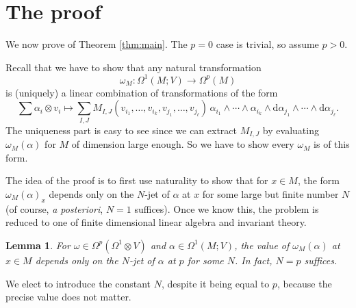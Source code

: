 \documentclass{shortart}
\newtheorem{lemma}[thm]{Lemma}
\theoremstyle{definition}
\renewcommand\d{\mathrm{d}}
\begin{document}
\section{The proof}\label{section:proof}
We now prove of Theorem \ref{thm:main}. The $p = 0$ case is trivial, so assume $p > 0$.

Recall that we have to show that any natural transformation
\[
  \omega_M: \Omega^1(M; V) \to \Omega^p(M)
\]
is (uniquely) a linear combination of transformations of the form
\[
  \sum \alpha_i \otimes v_i \mapsto \sum_{I, J} M_{I, J}(v_{i_1}, \ldots, v_{i_k}, v_{j_1}, \ldots, v_{j_\ell})\, \alpha_{i_1} \wedge \cdots \wedge \alpha_{i_k} \wedge \d \alpha_{j_1} \wedge \cdots \wedge \d \alpha_{j_\ell}.
\]
The uniqueness part is easy to see since we can extract $M_{I, J}$ by evaluating $\omega_M(\alpha)$ for $M$ of dimension large enough. So we have to show every $\omega_M$ is of this form.

The idea of the proof is to first use naturality to show that for $x \in M$, the form $\omega_M(\alpha)_x$ depends only on the $N$-jet of $\alpha$ at $x$ for some large but finite number $N$ (of course, \emph{a posteriori}, $N = 1$ suffices). Once we know this, the problem is reduced to one of finite dimensional linear algebra and invariant theory.

\begin{lemma}
  For $\omega \in \Omega^p(\Omega^1 \otimes V)$ and $\alpha \in \Omega^1(M; V)$, the value of $\omega_M(\alpha)$ at $x \in M$ depends only on the $N$-jet of $\alpha$ at $p$ for some $N$. In fact, $N = p$ suffices.
\end{lemma}
We elect to introduce the constant $N$, despite it being equal to $p$, because the precise value does not matter.
\end{document}
